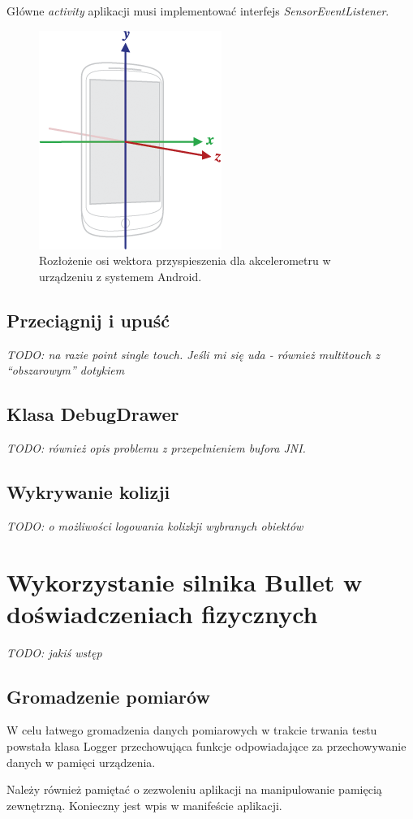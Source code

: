 Główne \emph{activity} aplikacji musi implementować interfejs
\emph{SensorEventListener}. 

\begin{figure}
\centering
\includegraphics[scale = 0.6]{./img/axis_device.png}
\caption{Rozłożenie osi wektora przyspieszenia dla akcelerometru w urządzeniu
z systemem Android.}
\label{fig:axis_device}
\end{figure}

\subsection{Przeciągnij i upuść}\label{sec:dragAndDrop}
\emph{TODO: na razie point single touch. Jeśli mi się uda - również multitouch
z ``obszarowym'' dotykiem}

\subsection{Klasa DebugDrawer}\label{sec:debugDrawer}
\emph{TODO: również opis problemu z przepełnieniem bufora JNI.}

\subsection{Wykrywanie kolizji}
\emph{TODO: o możliwości logowania kolizkji wybranych obiektów}

\newpage
\section{Wykorzystanie silnika Bullet w doświadczeniach fizycznych}
\emph{TODO: jakiś wstęp}

\subsection{Gromadzenie pomiarów}
W celu łatwego gromadzenia danych pomiarowych w trakcie trwania testu powstała
klasa Logger przechowująca funkcje odpowiadające za przechowywanie danych w
pamięci urządzenia.
  
Należy również pamiętać o zezwoleniu aplikacji na manipulowanie pamięcią
zewnętrzną. Konieczny jest wpis w manifeście aplikacji.


